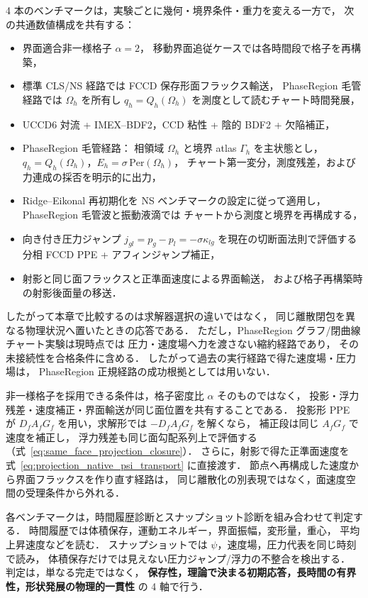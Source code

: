 4 本のベンチマークは，実験ごとに幾何・境界条件・重力を変える一方で，
次の共通数値構成を共有する：
\begin{itemize}[noitemsep,leftmargin=2em]
  \item 界面適合非一様格子 $\alpha=2$，
        移動界面追従ケースでは各時間段で格子を再構築，
  \item 標準 CLS/NS 経路では FCCD 保存形面フラックス輸送，
        PhaseRegion 毛管経路では $\Omega_h$ を所有し
        $q_h=Q_h(\Omega_h)$ を測度として読むチャート時間発展，
  \item UCCD6 対流 + IMEX--BDF2，CCD 粘性 + 陰的 BDF2 + 欠陥補正，
  \item PhaseRegion 毛管経路：
        相領域 $\Omega_h$ と境界 atlas $\Gamma_h$ を主状態とし，
        $q_h=Q_h(\Omega_h)$，$E_h=\sigma\,\mathrm{Per}(\Omega_h)$，
        チャート第一変分，測度残差，および
        力連成の採否を明示的に出力，
  \item Ridge--Eikonal 再初期化を NS ベンチマークの設定に従って適用し，
        PhaseRegion 毛管波と振動液滴では
        チャートから測度と境界を再構成する，
  \item 向き付き圧力ジャンプ
        $j_{gl}=p_g-p_l=-\sigma\kappa_{lg}$ を現在の切断面法則で評価する
        分相 FCCD PPE + アフィンジャンプ補正，
  \item 射影と同じ面フラックスと正準面速度による界面輸送，
        および格子再構築時の射影後面量の移送．
\end{itemize}
したがって本章で比較するのは求解器選択の違いではなく，
同じ離散閉包を異なる物理状況へ置いたときの応答である．
ただし，PhaseRegion グラフ/閉曲線チャート実験は現時点では
圧力・速度場へ力を渡さない縮約経路であり，
その未接続性を合格条件に含める．
したがって過去の実行経路で得た速度場・圧力場は，
PhaseRegion 正規経路の成功根拠としては用いない．

非一様格子を採用できる条件は，格子密度比 $\alpha$ そのものではなく，
投影・浮力残差・速度補正・界面輸送が同じ面位置を共有することである．
投影形 PPE が $D_fA_fG_f$ を用い，求解形では $-D_fA_fG_f$ を解くなら，
補正段は同じ $A_fG_f$ で速度を補正し，
浮力残差も同じ面勾配系列上で評価する
（式~\eqref{eq:same_face_projection_closure}）．
さらに，射影で得た正準面速度を
式~\eqref{eq:projection_native_psi_transport} に直接渡す．
節点へ再構成した速度から界面フラックスを作り直す経路は，
同じ離散化の別表現ではなく，面速度空間の受理条件から外れる．

各ベンチマークは，時間履歴診断とスナップショット診断を組み合わせて判定する．
時間履歴では体積保存，運動エネルギー，界面振幅，変形量，重心，
平均上昇速度などを読む．
スナップショットでは $\psi$，速度場，圧力代表を同じ時刻で読み，
体積保存だけでは見えない圧力ジャンプ/浮力の不整合を検出する．
判定は，単なる完走ではなく，
\textbf{保存性，理論で決まる初期応答，長時間の有界性，形状発展の物理的一貫性}
の 4 軸で行う．

